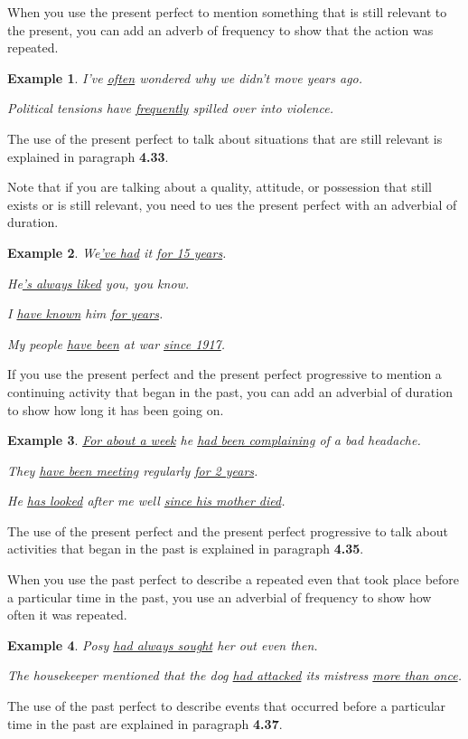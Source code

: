 \documentclass[oneside]{book}
\numberwithin{equation}{section}
\newtheorem{example}{Example}[section]
\begin{document}
%
\noindent{} When you use the present perfect to mention something that is still relevant to the present, you can add an adverb of frequency to show that the action was repeated.
\begin{example}
    I've \underline{often} wondered why we didn't move years ago.
    
    Political tensions have \underline{frequently} spilled over into violence.
\end{example}
The use of the present perfect to talk about situations that are still relevant is explained in paragraph \textbf{4.33}.

%
\noindent{} Note that if you are talking about a quality, attitude, or possession that still exists or is still relevant, you need to ues the present perfect with an adverbial of duration.
\begin{example}
    We\underline{'ve had} it \underline{for 15 years}.
    
    He\underline{'s always liked} you, you know.
    
    I \underline{have known} him \underline{for years}.
    
    My people \underline{have been} at war \underline{since 1917}.
\end{example}
%
\noindent{} If you use the present perfect and the present perfect progressive to mention a continuing activity that began in the past, you can add an adverbial of duration to show how long it has been going on.
\begin{example}
    \underline{For about a week} he \underline{had been complaining} of a bad headache.
    
    They \underline{have been meeting} regularly \underline{for 2 years}.
    
    He \underline{has looked} after me well \underline{since his mother died}.
\end{example}
The use of the present perfect and the present perfect progressive to talk about activities that began in the past is explained in paragraph \textbf{4.35}.

%
\noindent{} When you use the past perfect to describe a repeated even that took place before a particular time in the past, you use an adverbial of frequency to show how often it was repeated.
\begin{example}
    Posy \underline{had always sought} her out even then.
    
    The housekeeper mentioned that the dog \underline{had attacked} its mistress \underline{more than once}.
\end{example}
The use of the past perfect to describe events that occurred before a particular time in the past are explained in paragraph \textbf{4.37}.
\end{document}
